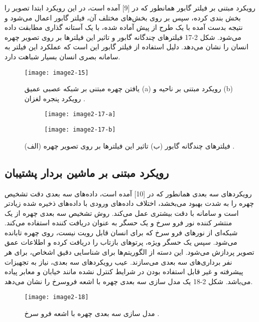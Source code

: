 	رویکرد مبتنی بر فیلتر گابور 
همانطور که در [9] آمده است، در این رویکرد ابتدا تصویر را بخش بندی کرده، سپس بر روی بخش‌های مختلف آن، فیلتر گابور اعمال می‌شود و نتیجه بدست آمده با یک طرح از پیش آماده شده، با یک آستانه گذاری مطابقت داده می‌شود. شکل 2-17 فیلترهای چندگانه گابور و تاثیر این فیلترها بر روی تصویر چهره انسان را نشان می‌دهد. دلیل استفاده از فیلتر گابور این است که عملکرد این فیلتر به سامانه بصری انسان بسیار شباهت دارد. 
 	 
\begin{figure}[h]
\centering
  \texttt{[image: image2-15]}
  \caption{یافتن چهره مبتنی بر شبکه عصبی عمیق (a) رویکرد مبتنی بر ناحیه و (b) رویکرد پنجره لغزان \cite{ref1}.}
  \label{image2-15}
\end{figure}

\begin{figure}
\begin{subfigure}{.5\textwidth}
  \centering
  \texttt{[image: image2-17-a]}
  \label{image2-17-a}
\end{subfigure}
\begin{subfigure}{.5\textwidth}
  \centering
  \texttt{[image: image2-17-b]}
  \label{image2-17-b}
\end{subfigure}
  \caption{(الف) فیلترهای چندگانه گابور (ب) تاثیر این فیلترها بر روی تصویر چهره \cite{ref1}.}
\label{fig:image2-17}
\end{figure}

 \subsection{رویکرد مبتنی بر ماشین بردار پشتیبان}
	رویکرد‌های سه بعدی
همانطور که در [10] آمده است، داده‌های سه بعدی دقت تشخیص چهره را به شدت بهبود می‌بخشد، اختلاف داده‌های ورودی با داده‌های ذخیره شده زیادتر است و سامانه با دقت بیشتری عمل می‌کند. روش تشخیص سه بعدی چهره از یک منتشر کننده نور فرو سرخ و یک حسگر به عنوان دریافت کننده استفاده می‌کند. شبکه‌ای از نورهای فرو سرخ که برای انسان قابل رویت نیست، روی چهره تابانده می‌شود. سپس یک حسگر ویژه، پرتوهای بازتاب را دریافت کرده و اطلاعات عمق تصویر پردازش می‌شود. این دسته از الگوریتم‌ها برای شناسایی دقیق اشخاص، برای هر نفر برداری‌های سه بعدی می‌سازند. عیب رویکردهای سه بعدی، نیاز به تجهیزات پیشرفته و غیر قابل استفاده بودن در شرایط کنترل نشده مانند خیابان و معابر پیاده می‌باشد. شکل 2-18 یک مدل سازی سه بعدی چهره با اشعه فروسرخ را نشان می‌دهد.

\begin{figure}[h]
\centering
  \texttt{[image: image2-18]}
  \caption{مدل سازی سه بعدی چهره با اشعه فرو سرخ \cite{ref1}.}
  \label{image2-15}
\end{figure}
 
